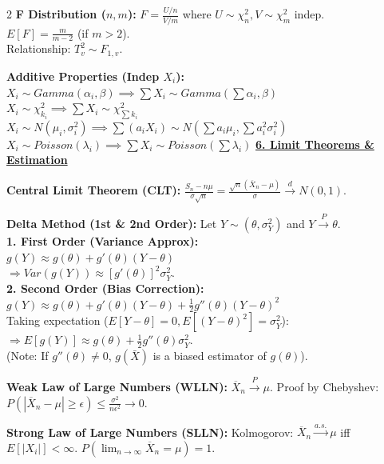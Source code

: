 \documentclass{article}
\newcommand{\sectiontitle}[1]{\vspace{0.1cm}\textbf{\underline{#1}}\vspace{0.1cm}}
\newcommand{\distname}[1]{\textbf{#1}}
\begin{document}
\begin{multicols*}{2}
\distname{F Distribution ($n, m$):}
$F = \frac{U/n}{V/m}$ where $U \sim \chi^2_n, V \sim \chi^2_m$ indep.
\\ $E[F] = \frac{m}{m-2}$ (if $m>2$).
\\ Relationship: $T_v^2 \sim F_{1, v}$.

\distname{Additive Properties (Indep $X_i$):}
\\ $X_i \sim Gamma(\alpha_i, \beta) \implies \sum X_i \sim Gamma(\sum \alpha_i, \beta)$
\\ $X_i \sim \chi^2_{k_i} \implies \sum X_i \sim \chi^2_{\sum k_i}$
\\ $X_i \sim N(\mu_i, \sigma_i^2) \implies \sum (a_i X_i) \sim N(\sum a_i \mu_i, \sum a_i^2 \sigma_i^2)$
\\ $X_i \sim Poisson(\lambda_i) \implies \sum X_i \sim Poisson(\sum \lambda_i)$
\sectiontitle{6. Limit Theorems \& Estimation}

\distname{Central Limit Theorem (CLT):}
$\frac{S_n - n\mu}{\sigma\sqrt{n}} = \frac{\sqrt{n}(\overline{X}_n - \mu)}{\sigma} \xrightarrow{d} N(0,1)$.

\distname{Delta Method (1st \& 2nd Order):}
Let $Y \sim (\theta, \sigma^2_Y)$ and $Y \xrightarrow{P} \theta$.
\\ \textbf{1. First Order (Variance Approx):}
\\ $g(Y) \approx g(\theta) + g'(\theta)(Y-\theta)$
\\ $\Rightarrow Var(g(Y)) \approx [g'(\theta)]^2 \sigma^2_Y$.
\\ \textbf{2. Second Order (Bias Correction):}
\\ $g(Y) \approx g(\theta) + g'(\theta)(Y-\theta) + \frac{1}{2}g''(\theta)(Y-\theta)^2$
\\ Taking expectation ($E[Y-\theta]=0, E[(Y-\theta)^2]=\sigma^2_Y$):
\\ $\Rightarrow E[g(Y)] \approx g(\theta) + \frac{1}{2}g''(\theta)\sigma^2_Y$.
\\ (Note: If $g''(\theta) \neq 0$, $g(\bar{X})$ is a biased estimator of $g(\theta)$).

\distname{Weak Law of Large Numbers (WLLN):}
$\overline{X}_n \xrightarrow{P} \mu$.
Proof by Chebyshev: $P(|\overline{X}_n - \mu| \ge \epsilon) \le \frac{\sigma^2}{n\epsilon^2} \to 0$.

\distname{Strong Law of Large Numbers (SLLN):}
Kolmogorov: $\overline{X}_n \xrightarrow{a.s.} \mu$ iff $E[|X_i|] < \infty$.
$P(\lim_{n \to \infty} \overline{X}_n = \mu) = 1$.


\end{multicols*}
\end{document}
